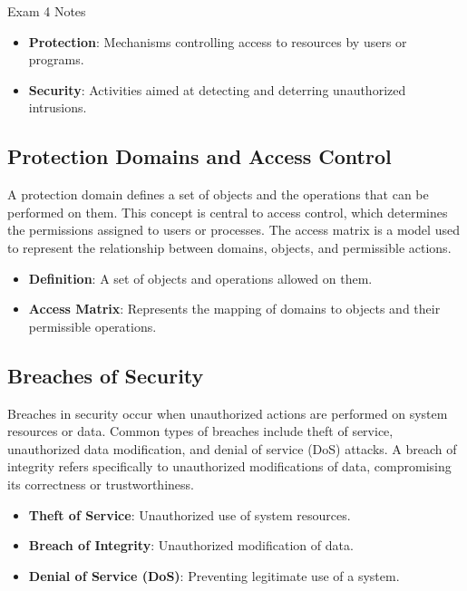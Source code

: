 \begin{examnotes}{Exam 4 Notes}
    \begin{highlight}
        \begin{itemize}
            \item \textbf{Protection}: Mechanisms controlling access to resources by users or programs.
            \item \textbf{Security}: Activities aimed at detecting and deterring unauthorized intrusions.
        \end{itemize}
    \end{highlight}
    
    \subsection*{Protection Domains and Access Control}
    
    A protection domain defines a set of objects and the operations that can be performed on them. This concept is central to access control, which determines the permissions assigned to users or processes. 
    The access matrix is a model used to represent the relationship between domains, objects, and permissible actions.
    
    \begin{highlight}
        \begin{itemize}
            \item \textbf{Definition}: A set of objects and operations allowed on them.
            \item \textbf{Access Matrix}: Represents the mapping of domains to objects and their permissible operations.
        \end{itemize}
    \end{highlight}
    
    \subsection*{Breaches of Security}
    
    Breaches in security occur when unauthorized actions are performed on system resources or data. Common types of breaches include theft of service, unauthorized data modification, and denial of service 
    (DoS) attacks. A breach of integrity refers specifically to unauthorized modifications of data, compromising its correctness or trustworthiness.
    
    \begin{highlight}
        \begin{itemize}
            \item \textbf{Theft of Service}: Unauthorized use of system resources.
            \item \textbf{Breach of Integrity}: Unauthorized modification of data.
            \item \textbf{Denial of Service (DoS)}: Preventing legitimate use of a system.
        \end{itemize}
    \end{highlight}
    

\end{examnotes}
